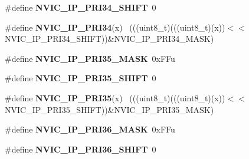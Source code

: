 \begin{DoxyCompactItemize}
\item 
\hypertarget{group___n_v_i_c___register___masks_ga479ed7007cd39304a3aa2da546ae8236}{}\#define {\bfseries N\+V\+I\+C\+\_\+\+I\+P\+\_\+\+P\+R\+I34\+\_\+\+S\+H\+I\+F\+T}~0\label{group___n_v_i_c___register___masks_ga479ed7007cd39304a3aa2da546ae8236}

\item 
\hypertarget{group___n_v_i_c___register___masks_gab8716be32f28531c6a08a73ab4490cc1}{}\#define {\bfseries N\+V\+I\+C\+\_\+\+I\+P\+\_\+\+P\+R\+I34}(x)                                              ~(((uint8\+\_\+t)(((uint8\+\_\+t)(x))$<$$<$N\+V\+I\+C\+\_\+\+I\+P\+\_\+\+P\+R\+I34\+\_\+\+S\+H\+I\+F\+T))\&N\+V\+I\+C\+\_\+\+I\+P\+\_\+\+P\+R\+I34\+\_\+\+M\+A\+S\+K)\label{group___n_v_i_c___register___masks_gab8716be32f28531c6a08a73ab4490cc1}

\item 
\hypertarget{group___n_v_i_c___register___masks_ga2b424bdc603b1bd16324b30b0274d5e3}{}\#define {\bfseries N\+V\+I\+C\+\_\+\+I\+P\+\_\+\+P\+R\+I35\+\_\+\+M\+A\+S\+K}~0x\+F\+Fu\label{group___n_v_i_c___register___masks_ga2b424bdc603b1bd16324b30b0274d5e3}

\item 
\hypertarget{group___n_v_i_c___register___masks_ga644968ce75390237139242037898baa8}{}\#define {\bfseries N\+V\+I\+C\+\_\+\+I\+P\+\_\+\+P\+R\+I35\+\_\+\+S\+H\+I\+F\+T}~0\label{group___n_v_i_c___register___masks_ga644968ce75390237139242037898baa8}

\item 
\hypertarget{group___n_v_i_c___register___masks_gab7f902735d3847b6eccf3ed5cdb9167e}{}\#define {\bfseries N\+V\+I\+C\+\_\+\+I\+P\+\_\+\+P\+R\+I35}(x)                                              ~(((uint8\+\_\+t)(((uint8\+\_\+t)(x))$<$$<$N\+V\+I\+C\+\_\+\+I\+P\+\_\+\+P\+R\+I35\+\_\+\+S\+H\+I\+F\+T))\&N\+V\+I\+C\+\_\+\+I\+P\+\_\+\+P\+R\+I35\+\_\+\+M\+A\+S\+K)\label{group___n_v_i_c___register___masks_gab7f902735d3847b6eccf3ed5cdb9167e}

\item 
\hypertarget{group___n_v_i_c___register___masks_ga44ea286c22e5459ca6ad0e3cbf6ca25f}{}\#define {\bfseries N\+V\+I\+C\+\_\+\+I\+P\+\_\+\+P\+R\+I36\+\_\+\+M\+A\+S\+K}~0x\+F\+Fu\label{group___n_v_i_c___register___masks_ga44ea286c22e5459ca6ad0e3cbf6ca25f}

\item 
\hypertarget{group___n_v_i_c___register___masks_gad7ad4240183c571ecf9a3c0b03e9a1c7}{}\#define {\bfseries N\+V\+I\+C\+\_\+\+I\+P\+\_\+\+P\+R\+I36\+\_\+\+S\+H\+I\+F\+T}~0\label{group___n_v_i_c___register___masks_gad7ad4240183c571ecf9a3c0b03e9a1c7}


\end{DoxyCompactItemize}
